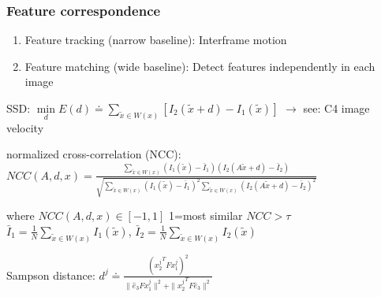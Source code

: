 \documentclass{../cheat}
\begin{document}
\begin{multicols}{3}
	\subsubsection{Feature correspondence}
	\begin{enumerate}[nolistsep, leftmargin=1em]
		\item Feature tracking (narrow baseline): Interframe motion
		\item Feature matching (wide baseline): Detect features independently in each image
	\end{enumerate}
	SSD: $\min \limits _{d}E(d) \doteq \sum_{\tilde{x}\in W(x)} [I_2(\tilde{x}+d)-I_1(\tilde{x})]$ $\rightarrow$ see: C4 image velocity
	
	normalized cross-correlation (NCC):\\
	$NCC(A,d,x)=\frac{\sum_{\tilde{x}\in W(x)} (I_1(\tilde{x})-\bar{I}_1) (I_2(A\tilde{x}+d)-\bar{I}_2)}
	{\sqrt{\sum_{\tilde{x}\in W(x)} (I_1(\tilde{x})-\bar{I}_1)^2
	 \sum_{\tilde{x}\in W(x)} (I_2(A\tilde{x}+d)-\bar{I}_2)^2}}$
	 
	 where $NCC(A,d,x)\in [-1,1]$ 1=most similar $NCC>\tau$\\
	  $\bar{I}_1=\frac{1}{N} \sum_{\tilde{x}\in W(x)} I_1(\tilde{x})$, 	 
	 $\bar{I}_2=\frac{1}{N} \sum_{\tilde{x}\in W(x)} I_2(\tilde{x})$
	 
	Sampson distance:
	$d^j\doteq \frac{({x_2^j}^T F x_1^j)^2}
	{\parallel \widehat{e}_3F x_1^j\parallel^2 +\parallel{x_2^j}^T F \widehat{e}_3\parallel^2}$
	

\end{multicols}
\end{document}
